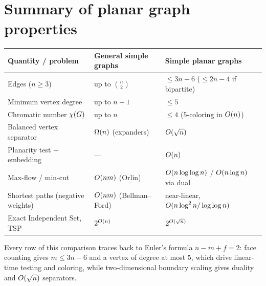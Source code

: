 \section{Summary of planar graph properties}
\label{ch26:summary}

\begin{center}
\begin{tabular}{@{}lll@{}}
\toprule
Quantity / problem & General simple graphs & Simple planar graphs \\
\midrule
Edges ($n \ge 3$) & up to $\binom{n}{2}$ & $\le 3n-6$ ($\le 2n-4$ if bipartite) \\
Minimum vertex degree & up to $n-1$ & $\le 5$ \\
Chromatic number $\chi(G)$ & up to $n$ & $\le 4$ ($5$-coloring in $O(n)$) \\
Balanced vertex separator & $\Omega(n)$ (expanders) & $O(\sqrt n)$ \\
Planarity test + embedding & --- & $O(n)$ \\
Max-flow / min-cut & $O(nm)$ (Orlin) & $O(n\log\log n)$ / $O(n\log n)$ via dual \\
Shortest paths (negative weights) & $O(nm)$ (Bellman--Ford) & near-linear, $O(n\log^2 n/\log\log n)$ \\
Exact Independent Set, TSP & $2^{O(n)}$ & $2^{O(\sqrt n)}$ \\
\bottomrule
\end{tabular}
\end{center}

Every row of this comparison traces back to Euler's formula $n - m + f = 2$: face counting
gives $m \le 3n - 6$ and a vertex of degree at most $5$, which drive linear-time testing and
coloring, while two-dimensional boundary scaling gives duality and $O(\sqrt n)$ separators.

